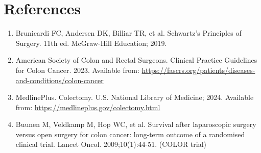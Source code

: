 \section*{References}
\begin{enumerate}
  \item Brunicardi FC, Andersen DK, Billiar TR, et al. Schwartz's Principles of Surgery. 11th ed. McGraw-Hill Education; 2019.
  \item American Society of Colon and Rectal Surgeons. Clinical Practice Guidelines for Colon Cancer. 2023. Available from: \url{https://fascrs.org/patients/diseases-and-conditions/colon-cancer}
  \item MedlinePlus. Colectomy. U.S. National Library of Medicine; 2024. Available from: \url{https://medlineplus.gov/colectomy.html}
  \item Buunen M, Veldkamp M, Hop WC, et al. Survival after laparoscopic surgery versus open surgery for colon cancer: long-term outcome of a randomised clinical trial. Lancet Oncol. 2009;10(1):44-51. (COLOR trial)
\end{enumerate}

\clearpage

